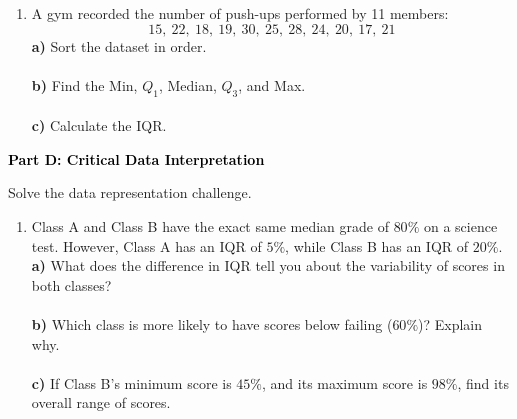 \documentclass[12pt, letterpaper, fleqn]{article}
\newcommand{\blanklong}{\underline{\hspace{6.5cm}}}
\begin{document}
\begin{enumerate}[itemsep=2.5cm, leftmargin=0.6cm]
\item A gym recorded the number of push-ups performed by 11 members: \\
$$15, \ 22, \ 18, \ 19, \ 30, \ 25, \ 28, \ 24, \ 20, \ 17, \ 21$$
\textbf{a)} Sort the dataset in order. \\
\blanklong \\
\textbf{b)} Find the Min, $Q_1$, Median, $Q_3$, and Max. \\
\blanklong \\
\textbf{c)} Calculate the IQR. \\
\blanklong
\end{enumerate}

\newpage

\begin{tcolorbox}[colback=black!10]
    \large\textcolor{black}{\textbf{Part D: Critical Data Interpretation}}
\end{tcolorbox}

\vspace{3mm}

\noindent
Solve the data representation challenge.

\vspace{5mm}

\begin{enumerate}[itemsep=2.5cm, leftmargin=0.6cm]
\item Class A and Class B have the exact same median grade of $80\%$ on a science test. However, Class A has an IQR of $5\%$, while Class B has an IQR of $20\%$. \\
\textbf{a)} What does the difference in IQR tell you about the variability of scores in both classes? \\
\blanklong \\
\textbf{b)} Which class is more likely to have scores below failing ($60\%$)? Explain why. \\
\blanklong \\
\textbf{c)} If Class B's minimum score is $45\%$, and its maximum score is $98\%$, find its overall range of scores. \\
\blanklong
\end{enumerate}
\end{document}
